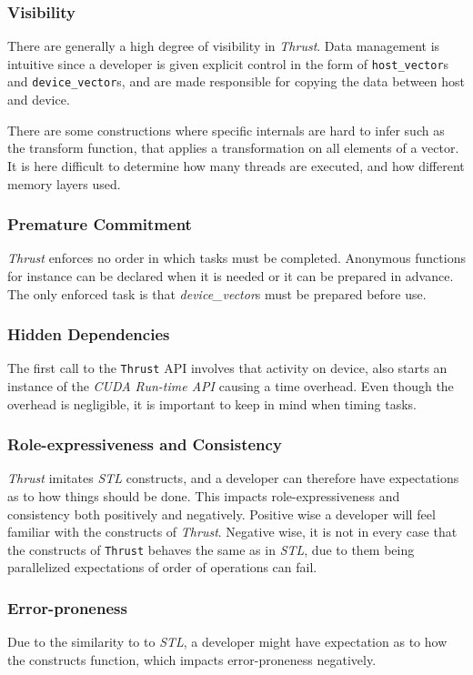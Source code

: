 \subsubsection[*]{Visibility}
There are generally a high degree of visibility in \textit{Thrust}. Data management is intuitive since a developer is given explicit control in the form of \texttt{host\_vector}s and \texttt{device\_vector}s, and are made responsible for copying the data between host and device. 

There are some constructions where specific internals are hard to infer such as the transform function, that applies a transformation on all elements of a vector. It is here difficult to determine how many threads are executed, and how different memory layers used.

\subsubsection[*]{Premature Commitment}
\textit{Thrust} enforces no order in which tasks must be completed. Anonymous functions for instance can be declared when it is needed or it can be prepared in advance. The only enforced task is that \textit{device\_vector}s must be prepared before use.

\subsubsection[*]{Hidden Dependencies}
The first call to the \texttt{Thrust} API involves that activity on device, also starts an instance of the \textit{CUDA Run-time API} causing a time overhead. Even though the overhead is negligible, it is important to keep in mind when timing tasks.

\subsubsection[*]{Role-expressiveness and Consistency}
\textit{Thrust} imitates \textit{STL} constructs, and a developer can therefore have expectations as to how things should be done. This impacts role-expressiveness and consistency both positively and negatively. Positive wise a developer will feel familiar with the constructs of \textit{Thrust}. Negative wise, it is not in every case that the constructs of \texttt{Thrust} behaves the same as in \textit{STL}, due to them being parallelized expectations of order of operations can fail.

\subsubsection[*]{Error-proneness}
Due to the similarity to to \textit{STL}, a developer might have expectation as to how the constructs function, which impacts error-proneness negatively.

